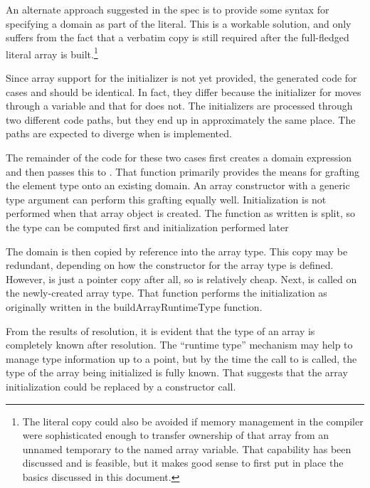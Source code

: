 An alternate approach suggested in
the spec is to provide some syntax for specifying a domain as part of the literal.  
This is a workable solution, and only suffers from the fact that a verbatim copy is still
required after the full-fledged literal array is built.\footnote{The literal copy could also
  be avoided if memory management in the compiler were sophisticated enough to transfer
  ownership of that array from an unnamed temporary to the named array variable.  That
  capability has been discussed and is feasible, but it makes good sense to first put
  in place the basics discussed in this document.}

Since array support for the  initializer is not yet provided, the generated code for
cases  and  should be identical.  In fact, they differ because the
initializer for  moves through a  variable and that for 
does not.  The initializers are processed through two different code paths, but they end
up in approximately the same place.  The paths are expected to diverge when 
is implemented.

The remainder of the code for these two cases first creates a domain expression and then
passes this to .  That function primarily provides the
means for grafting the element type onto an existing domain.  An array constructor with a
generic type argument can perform this grafting equally well.  Initialization is not
performed when that array object is created.  The function as written is split, so the
type can be computed first and initialization performed later

The domain is then copied by reference into the array type.  This copy may be redundant,
depending on how the constructor for the array type is defined.  However, is just a
pointer copy after all, so is relatively cheap.  Next,
 is called on the newly-created array type.  That
function performs the initialization as originally written in the buildArrayRuntimeType
function.

From the results of resolution, it is evident that the type of an array is completely
known after resolution.  The ``runtime type'' mechanism may help to manage type
information up to a point, but by the time the call to
 is called, the type of the array being initialized
is fully known.  That suggests that the array initialization could be replaced by a
constructor call.


